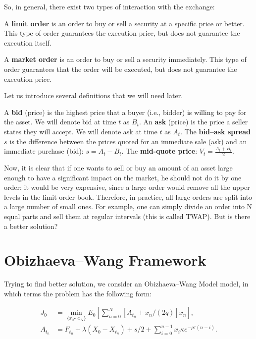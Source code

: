 So, in general, there exist 
two types of interaction with the exchange:
\begin{definition}
    A \textbf{limit order} is an order to buy or sell a security at a specific price or better. This type of order guarantees the execution price, but does not guarantee the execution itself.
\end{definition}
\begin{definition}
    A \textbf{market order} is an order to buy or sell a security immediately. This type of order guarantees that the order will be executed, but does not guarantee the execution price.
\end{definition}

Let us introduce several definitions that we will need later.
\begin{definition}
    A \textbf{bid} (price) is the highest price that a buyer (i.e., bidder) is willing to pay for the asset. We will denote bid at time $t$ as $B_t$.
    An \textbf{ask} (price) is the price a seller states they will accept. We will denote ask at time $t$ as $A_t$.
    The \textbf{bid–ask spread} $s$ is the difference between the prices quoted for an immediate sale (ask) and an immediate purchase (bid): $s = A_t - B_t$.
    The \textbf{mid-quote price}: $V_{t} = \frac{A_{t} + B_{t}}{2}$.
\end{definition}


Now, it is clear that if one wants to sell or buy an amount of an asset large enough to have a significant 
impact on the market, he should not do it by one order: it would be very expensive, since a large order 
would remove all the upper levels in the limit order book. Therefore, in practice, all large orders are split into a large number of small ones. 
For example, one can simply divide an order into N equal parts and sell them at regular intervals (this is called TWAP).
But is there a better solution?


\section{Obizhaeva--Wang Framework}
Trying to find better solution, we consider an Obizhaeva--Wang Model model, in which terms the problem has the following form: \par
\begin{align*} \label{oEproblem}
    J_0 &= \min _{\{x_0 \cdots x_N \}} E_0 \left[ \sum _{n=0}^N [A_{t_n} + x_n /(2q)] x_n\right],  \\
    A_{t_n} &= F_{t_n} + \lambda (X_0 - X_{t_n}) + s/2 + \sum _{i=0}^{n-1} x_i \kappa e^{- \rho \tau (n - i)}.
 \end{align*}
 

